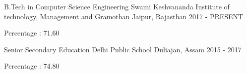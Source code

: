 


\begin{cventries}


\cventry
{B.Tech in Computer Science Engineering} %
{Swami Keshvananda Institute of technology, Management and Gramothan} %
{Jaipur, Rajasthan} %
{2017 - PRESENT} %
{ %
\begin{cvitems}
\item{Percentage : 71.60}
\end{cvitems}
}

\cventry
{Senior Secondary Education}
{Delhi Public School}
{Duliajan, Assam}
{2015 - 2017}
{
\begin{cvitems}
\item{Percentage : 74.80}
\end{cvitems}
}




\end{cventries}